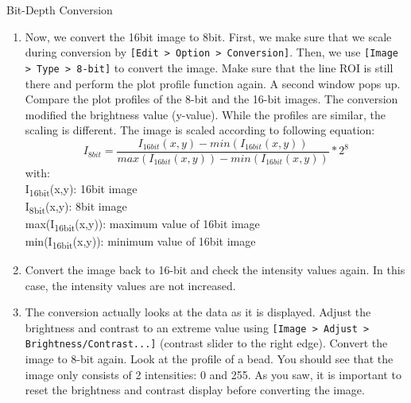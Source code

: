 \begin{taskbox}{Bit-Depth Conversion}
\begin{enumerate}
\begin{minipage}[t]{\linewidth}
		\begin{center}
		\medskip
		\label{fig:plot-profile-example}
		\end{center}
	\end{minipage}

\item Now, we convert the 16bit image to 8bit. First, we make sure that we scale during conversion by \texttt{[Edit > Option > Conversion]}. Then, we use \texttt{[Image > Type > 8-bit]} to convert the image. Make sure that the line ROI is still there and perform the plot profile function again. A second window pops up. Compare the plot profiles of the 8-bit and the 16-bit images. The conversion modified the brightness value (y-value). While the profiles are similar, the scaling is different. The image is scaled according to following equation:
	\[I_{8bit}=\frac{I_{16bit}(x,y)-min(I_{16bit}(x,y))}{max(I_{16bit}(x,y))-min(I_{16bit}(x,y))}*2^8
	\]
with:\\
I\textsubscript{16bit}(x,y): 16bit image\\
I\textsubscript{8bit}(x,y): 8bit image\\
max(I\textsubscript{16bit}(x,y)): maximum value of 16bit image\\
min(I\textsubscript{16bit}(x,y)): minimum value of 16bit image\\
\item Convert the image back to 16-bit and check the intensity values again. In this case, the intensity values are not increased. 
\item The conversion actually looks at the data as it is displayed. Adjust the brightness and contrast to an extreme value using \texttt{[Image > Adjust > Brightness/Contrast...]} (contrast slider to the right edge). Convert the image to 8-bit again. Look at the profile of a bead. You should see that the image only consists of 2 intensities: 0 and 255. As you saw, it is important to reset the brightness and contrast display before converting the image.
\end{enumerate}

\end{taskbox}

